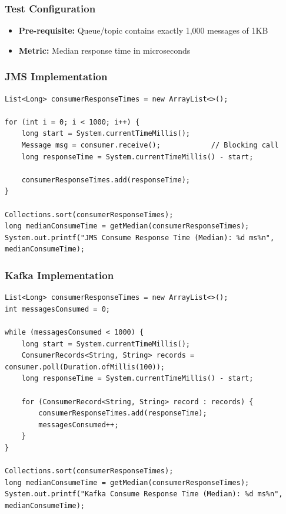 \documentclass[11pt,a4paper]{article}
\begin{document}
\subsubsection{Test Configuration}
\begin{itemize}
    \item \textbf{Pre-requisite:} Queue/topic contains exactly 1,000 messages of 1KB
    \item \textbf{Metric:} Median response time in microseconds
\end{itemize}

\subsubsection{JMS Implementation}
\begin{lstlisting}[style=javastyle, caption=JMS Consumer Response Time Test]
List<Long> consumerResponseTimes = new ArrayList<>();

for (int i = 0; i < 1000; i++) {
    long start = System.currentTimeMillis();
    Message msg = consumer.receive();            // Blocking call
    long responseTime = System.currentTimeMillis() - start;
    
    consumerResponseTimes.add(responseTime);
}

Collections.sort(consumerResponseTimes);
long medianConsumeTime = getMedian(consumerResponseTimes);
System.out.printf("JMS Consume Response Time (Median): %d ms%n", medianConsumeTime);
\end{lstlisting}

\subsubsection{Kafka Implementation}
\begin{lstlisting}[style=javastyle, caption=Kafka Consumer Response Time Test]
List<Long> consumerResponseTimes = new ArrayList<>();
int messagesConsumed = 0;

while (messagesConsumed < 1000) {
    long start = System.currentTimeMillis();
    ConsumerRecords<String, String> records = consumer.poll(Duration.ofMillis(100));
    long responseTime = System.currentTimeMillis() - start;
    
    for (ConsumerRecord<String, String> record : records) {
        consumerResponseTimes.add(responseTime);
        messagesConsumed++;
    }
}

Collections.sort(consumerResponseTimes);
long medianConsumeTime = getMedian(consumerResponseTimes);
System.out.printf("Kafka Consume Response Time (Median): %d ms%n", medianConsumeTime);
\end{lstlisting}
\end{document}
